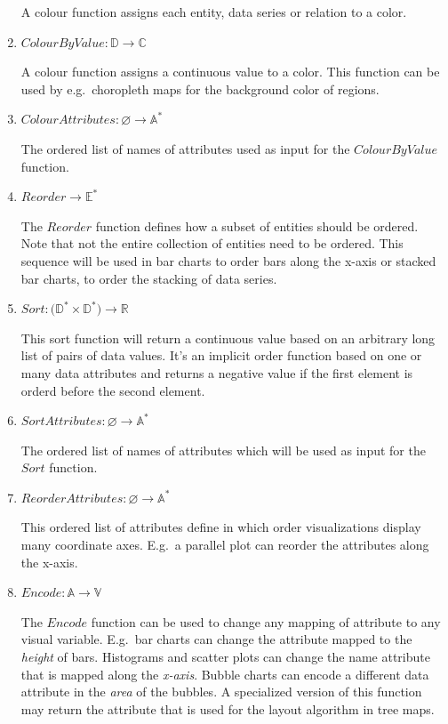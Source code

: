 \documentclass{article}
\begin{document}
\begin{enumerate}
        A colour function assigns each entity, data series or relation to a color.
    \item
        $ ColourByValue: \mathbb{D} \rightarrow \mathbb{C} $

        A colour function assigns a continuous value to a color.
        This function can be used by e.g.\ choropleth maps for the background color of regions.
    \item
        $ ColourAttributes: \varnothing \rightarrow \mathbb{A^*} $

        The ordered list of names of attributes used as input for the $ ColourByValue $ function.
    \item
        $ Reorder\rightarrow \mathbb{E^*} $

        The $Reorder$ function defines how a subset of entities should be ordered.
        Note that not the entire collection of entities need to be ordered.
        This sequence will be used in bar charts to order bars along the x-axis or stacked bar charts, to order the stacking of data series.
    \item
        $ Sort: \big( \mathbb{D^*} \times \mathbb{D^*} \big) \rightarrow \mathbb{R} $

        This sort function will return a continuous value based on an arbitrary long list of pairs of data values.
        It's an implicit order function based on one or many data attributes and returns a negative value if the first element is orderd before the second element.
    \item
        $ SortAttributes: \varnothing \rightarrow \mathbb{A^*} $

        The ordered list of names of attributes which will be used as input for the $Sort$ function.
    \item
        $ ReorderAttributes: \varnothing \rightarrow \mathbb{A^*} $

        This ordered list of attributes define in which order visualizations display many coordinate axes.
        E.g.\ a parallel plot can reorder the attributes along the x-axis.
    \item
        $ Encode: \mathbb{A} \rightarrow \mathbb{V} $

        The $Encode$ function can be used to change any mapping of attribute to any visual variable.
        E.g.\ bar charts can change the attribute mapped to the \emph{height} of bars.
        Histograms and scatter plots can change the name attribute that is mapped along the \emph{x-axis}.
        Bubble charts can encode a different data attribute in the \emph{area} of the bubbles.
        A specialized version of this function may return the attribute that is used for the layout algorithm in tree maps. 
\end{enumerate}
\end{document}
